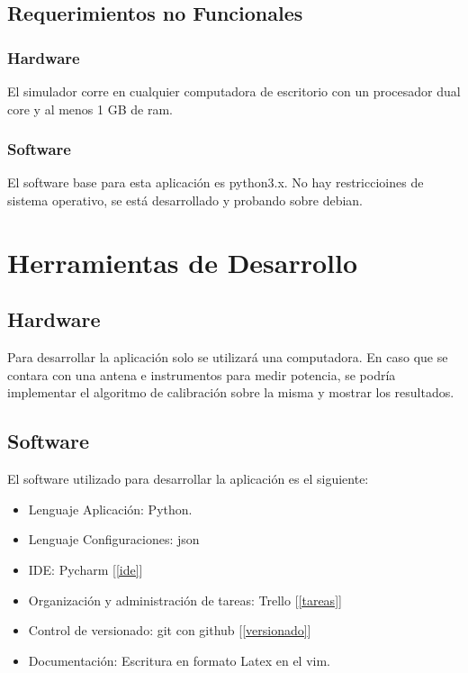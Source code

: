 \documentclass[a4paper,10pt]{article}
\begin{document}
\subsection{Requerimientos no Funcionales}

\subsubsection{Hardware}

    El simulador corre en cualquier computadora de escritorio con un procesador
dual core y al menos 1 GB de ram. 

\subsubsection{Software}

    El software base para esta aplicación es python3.x. No hay restriccioines de
sistema operativo, se está desarrollado y probando sobre debian.

\section{Herramientas de Desarrollo}

\subsection{Hardware}

Para desarrollar la aplicación solo se utilizará una computadora. En caso que se
contara con una antena e instrumentos para medir potencia, se podría implementar
el algoritmo de calibración sobre la misma y mostrar los resultados. 

\subsection{Software}

El software utilizado para desarrollar la aplicación es el siguiente:
\begin{itemize}
    \item Lenguaje Aplicación: Python.
    \item Lenguaje Configuraciones: json
    \item IDE: Pycharm [\ref{ide}]
    \item Organización y administración de tareas: Trello [\ref{tareas}]
    \item Control de versionado: git con github [\ref{versionado}]
    \item Documentación: Escritura en formato Latex en el vim.
\end{itemize}   
    
\end{document}
